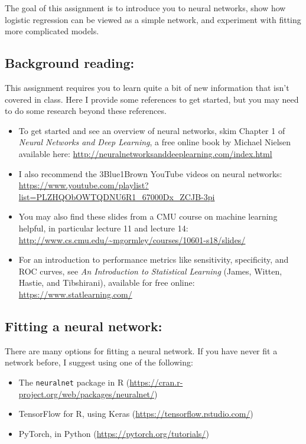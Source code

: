 \documentclass[11pt]{article}
\begin{document}
The goal of this assignment is to introduce you to neural networks, show how logistic regression can be viewed as a simple network, and experiment with fitting more complicated models.

\subsection*{Background reading:} This assignment requires you to learn quite a bit of new information that isn't covered in class. Here I provide some references to get started, but you may need to do some research beyond these references.

\begin{itemize}
\item To get started and see an overview of neural networks, skim Chapter 1 of \textit{Neural Networks and Deep Learning}, a free online book by Michael Nielsen available here: \url{http://neuralnetworksanddeeplearning.com/index.html}
\item I also recommend the 3Blue1Brown YouTube videos on neural networks: \url{https://www.youtube.com/playlist?list=PLZHQObOWTQDNU6R1_67000Dx_ZCJB-3pi}
\item You may also find these slides from a CMU course on machine learning helpful, in particular lecture 11 and lecture 14: \url{http://www.cs.cmu.edu/~mgormley/courses/10601-s18/slides/}
\item For an introduction to performance metrics like sensitivity, specificity, and ROC curves, see \textit{An Introduction to Statistical Learning} (James, Witten, Hastie, and Tibshirani), available for free online: \url{https://www.statlearning.com/}
\end{itemize}

\subsection*{Fitting a neural network:} There are many options for fitting a neural network. If you have never fit a network before, I suggest using one of the following:

\begin{itemize}
\item The \texttt{neuralnet} package in R (\url{https://cran.r-project.org/web/packages/neuralnet/})
\item TensorFlow for R, using Keras (\url{https://tensorflow.rstudio.com/})
\item PyTorch, in Python (\url{https://pytorch.org/tutorials/})
\end{itemize}
\end{document}
